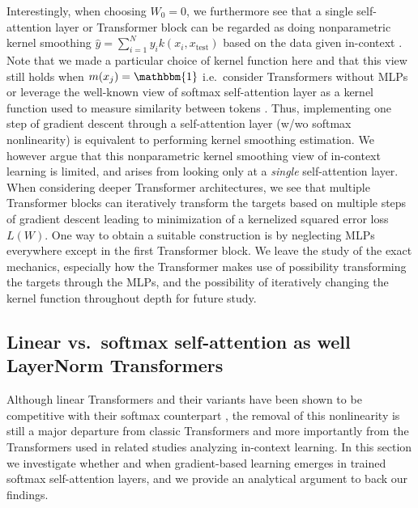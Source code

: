 \documentclass{article}
\theoremstyle{plain}
\theoremstyle{definition}
\theoremstyle{remark}
\begin{document}
Interestingly, when choosing $W_0=0$, we furthermore see that a single self-attention layer or Transformer block can be regarded as doing nonparametric kernel smoothing $\hat{y}=\sum_{i=1}^N y_i k(x_i, x_{\text{test}})$  based on the data given in-context \citep{nadaraya1964estimating,watson1964smooth}. Note that we made a particular choice of kernel function here and that this view still holds when $m(x_j)=\mathbbm{1}$ i.e.~consider Transformers without MLPs or leverage the well-known view of softmax self-attention layer as a kernel function used to measure similarity between tokens \citep[e.g.][]{choromanski2021rethinking,zhang2021dive}. 
Thus, implementing one step of gradient descent through a self-attention layer (w/wo softmax nonlinearity) is equivalent to performing kernel smoothing estimation. We however argue that this nonparametric kernel smoothing view of in-context learning is limited, and arises from looking only at a \textit{single} self-attention layer.
When considering deeper Transformer architectures, we see that multiple Transformer blocks can iteratively transform the targets based on multiple steps of gradient descent leading to minimization of a kernelized squared error loss $L(W)$. One way to obtain a suitable construction is by neglecting MLPs everywhere except in the first Transformer block. 
We leave the study of the exact mechanics, especially how the Transformer makes use of possibility transforming the targets through the MLPs, and the possibility of iteratively changing the kernel function throughout depth for future study.

\subsection{Linear vs.~softmax self-attention as well LayerNorm Transformers}
\label{app:softmax}

\label{ref:linear_vs_softmax} Although linear Transformers and their variants have been shown to be competitive with their softmax counterpart \citep{irie2021going}, the removal of this nonlinearity is still a major departure from classic Transformers and more importantly from the Transformers used in related studies analyzing in-context learning. In this section we investigate whether and when gradient-based learning emerges in trained softmax self-attention layers, and we provide an analytical argument to back our findings.
\end{document}
